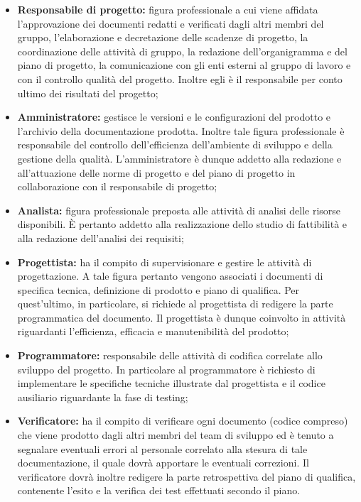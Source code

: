 \begin{itemize}
    \item \textbf{Responsabile di progetto:} figura professionale a cui viene affidata l'approvazione dei documenti redatti e verificati dagli altri membri del gruppo, l'elaborazione e decretazione delle scadenze di progetto, la coordinazione delle attività di gruppo, la redazione dell'organigramma e del piano di progetto, la comunicazione con gli enti esterni al gruppo di lavoro e con il controllo  qualità del progetto. Inoltre egli è il responsabile per conto ultimo dei risultati del progetto;
    \item \textbf{Amministratore:} gestisce le versioni e le configurazioni del prodotto e l'archivio della documentazione prodotta. Inoltre tale figura professionale è responsabile del controllo dell'efficienza  dell'ambiente di sviluppo e della gestione della qualità. L'amministratore è dunque addetto alla redazione e all'attuazione delle norme di progetto e del piano di progetto in collaborazione con il responsabile di  progetto;
    \item \textbf{Analista:} figura professionale preposta alle attività di analisi delle risorse disponibili. \`E pertanto addetto alla realizzazione dello studio di fattibilità e alla redazione dell'analisi dei requisiti;
    \item \textbf{Progettista:} ha il compito di supervisionare e gestire le attività di progettazione. A tale figura pertanto vengono associati i documenti di specifica tecnica, definizione di prodotto e piano di qualifica. Per quest'ultimo, in particolare, si richiede al progettista di redigere la parte programmatica del documento. Il progettista è dunque coinvolto in attività riguardanti l'efficienza, efficacia e manutenibilità del prodotto;
    \item \textbf{Programmatore:} responsabile delle attività di codifica correlate allo sviluppo del progetto. In particolare al programmatore è richiesto di implementare le specifiche tecniche illustrate dal progettista e il codice ausiliario riguardante la fase di testing;
    \item \textbf{Verificatore:} ha il compito di verificare ogni documento (codice compreso) che viene prodotto dagli altri membri del team di sviluppo ed è tenuto a segnalare eventuali errori al personale correlato alla stesura di tale documentazione, il quale dovrà apportare le eventuali correzioni. Il verificatore dovrà inoltre redigere la parte retrospettiva del piano di qualifica, contenente l'esito e la verifica dei test effettuati secondo il piano. 
\end{itemize}






